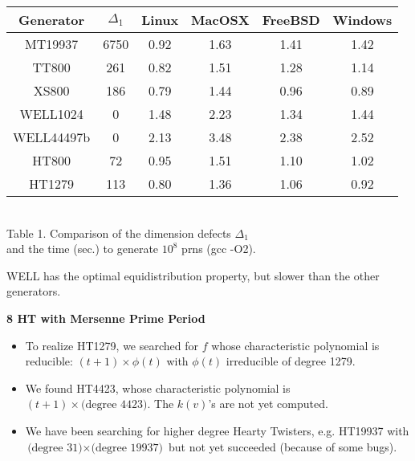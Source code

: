 \documentclass[a4j,12pt,landscape]{jarticle}
\begin{document}
\newpage
\begin{center}
\begin{tabular}{|c||c|c|c|c|c|}
\hline
{\Huge Generator}& {\Huge $\Delta_1$} 
  & {\Huge Linux} & {\Huge MacOSX} & {\Huge FreeBSD} & {\Huge Windows} \\ \hline \hline
{\Huge MT19937} & {\Huge 6750}
  & {\Huge 0.92} & {\Huge 1.63} & {\Huge 1.41} & {\Huge 1.42} \\ \hline
{\Huge TT800}  & {\Huge 261} 
  & {\Huge 0.82} & {\Huge 1.51} & {\Huge 1.28} & {\Huge 1.14} \\ \hline
{\Huge XS800} & {\Huge 186}
  & {\Huge 0.79} & {\Huge 1.44} & {\Huge 0.96} & {\Huge 0.89} \\ \hline
{\Huge WELL1024} & {\Huge 0}
  & {\Huge 1.48} & {\Huge 2.23} & {\Huge 1.34} & {\Huge 1.44} \\ \hline
{\Huge WELL44497b} & {\Huge 0}
  & {\Huge 2.13} & {\Huge 3.48} & {\Huge 2.38} & {\Huge 2.52} \\ \hline
{\Huge HT800} & {\Huge 72} 
  & {\Huge 0.95} & {\Huge 1.51} & {\Huge 1.10} & {\Huge 1.02} \\\hline
{\Huge HT1279} & {\Huge 113}
  & {\Huge 0.80} & {\Huge 1.36} & {\Huge 1.06} & {\Huge 0.92} \\ \hline
\end{tabular}
\\
\vskip 5mm
Table 1. Comparison of the dimension defects $\Delta_1$ 
\\
and the time (sec.) to generate $10^8$ prns (gcc -O2). 
\end{center}

WELL has the optimal equidistribution property, 
but slower than the other generators. 

\newpage
\noindent
{\bf 8 HT with Mersenne Prime Period}\\
\begin{itemize}
\item To realize HT1279, we searched for $f$ whose
characteristic polynomial is reducible: 
$(t+1)\times \phi(t)$ with $\phi(t)$ irreducible of degree 1279.
\item We found HT4423, whose characteristic polynomial is \\
$(t+1)\times \mbox{(degree 4423)}$. The $k(v)$'s are not yet computed. 
\item We have been searching for higher degree Hearty Twisters,
e.g. HT19937 with $\mbox{(degree 31)} \times \mbox{(degree 19937)}$
but not yet succeeded (because of some bugs).
\end{itemize}
\end{document}
